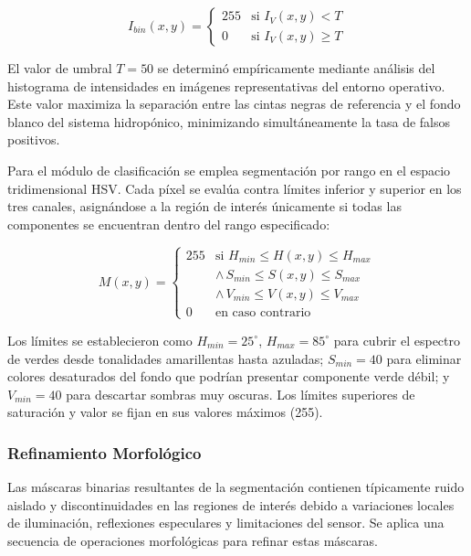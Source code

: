 \begin{equation}
I_{bin}(x,y) = \begin{cases}
255 & \text{si } I_V(x,y) < T \\
0 & \text{si } I_V(x,y) \geq T
\end{cases}
\end{equation}

El valor de umbral $T = 50$ se determinó empíricamente mediante análisis del histograma de intensidades en imágenes representativas del entorno operativo. Este valor maximiza la separación entre las cintas negras de referencia y el fondo blanco del sistema hidropónico, minimizando simultáneamente la tasa de falsos positivos.

Para el módulo de clasificación se emplea segmentación por rango en el espacio tridimensional HSV. Cada píxel se evalúa contra límites inferior y superior en los tres canales, asignándose a la región de interés únicamente si todas las componentes se encuentran dentro del rango especificado:

\begin{equation}
M(x,y) = \begin{cases}
255 & \text{si } H_{min} \leq H(x,y) \leq H_{max} \\
& \land \, S_{min} \leq S(x,y) \leq S_{max} \\
& \land \, V_{min} \leq V(x,y) \leq V_{max} \\
0 & \text{en caso contrario}
\end{cases}
\end{equation}

Los límites se establecieron como $H_{min} = 25^\circ$, $H_{max} = 85^\circ$ para cubrir el espectro de verdes desde tonalidades amarillentas hasta azuladas; $S_{min} = 40$ para eliminar colores desaturados del fondo que podrían presentar componente verde débil; y $V_{min} = 40$ para descartar sombras muy oscuras. Los límites superiores de saturación y valor se fijan en sus valores máximos (255).

\subsubsection{Refinamiento Morfológico}

Las máscaras binarias resultantes de la segmentación contienen típicamente ruido aislado y discontinuidades en las regiones de interés debido a variaciones locales de iluminación, reflexiones especulares y limitaciones del sensor. Se aplica una secuencia de operaciones morfológicas para refinar estas máscaras.

